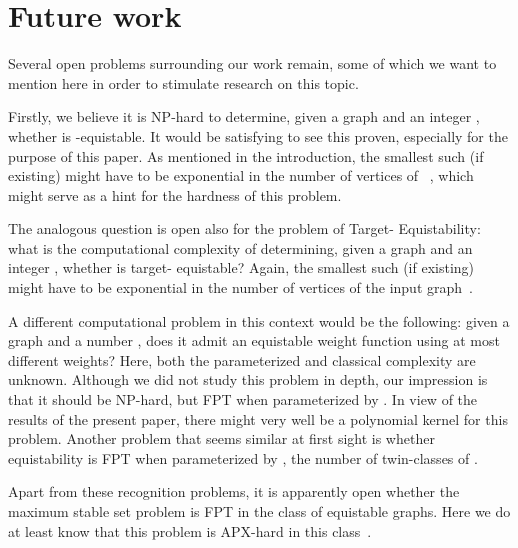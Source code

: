 \documentclass{llncs}
\begin{document}
\section{Future work}

Several open problems surrounding our work remain, some of which we want to mention here in order to stimulate
research on this topic.

Firstly, we believe it is NP-hard to determine, given a graph  and an integer , whether  is -equistable.
It would be satisfying to see this proven, especially for the purpose of this paper. As mentioned in the introduction, the smallest such  (if existing) might have to be exponential in the number of vertices of ~\cite{MR2823204}, which might serve as a hint for the hardness of this problem.

The analogous question is open also for the problem of {\sc Target- Equistability}: what is the computational complexity of
determining, given a graph  and an integer , whether  is target- equistable? Again, the smallest such  (if existing) might have to be exponential in the number of vertices of the input graph~\cite{MR2823204}.

A different computational problem in this context would be the following: given a graph  and a number , does it admit an equistable weight function using at most  different weights? Here, both the parameterized and classical complexity are unknown.
Although we did not study this problem in depth, our impression is that it should be NP-hard, but FPT when parameterized by .
In view of the results of the present paper, there might very well be a polynomial kernel for this problem.
Another problem that seems similar at first sight is whether equistability is FPT when parameterized by , the number of twin-classes of .

Apart from these recognition problems, it is apparently open whether the maximum stable set problem
is FPT in the class of equistable graphs. Here we do at least know that this problem is APX-hard in this class~\cite{MR2823204}.



\end{document}
